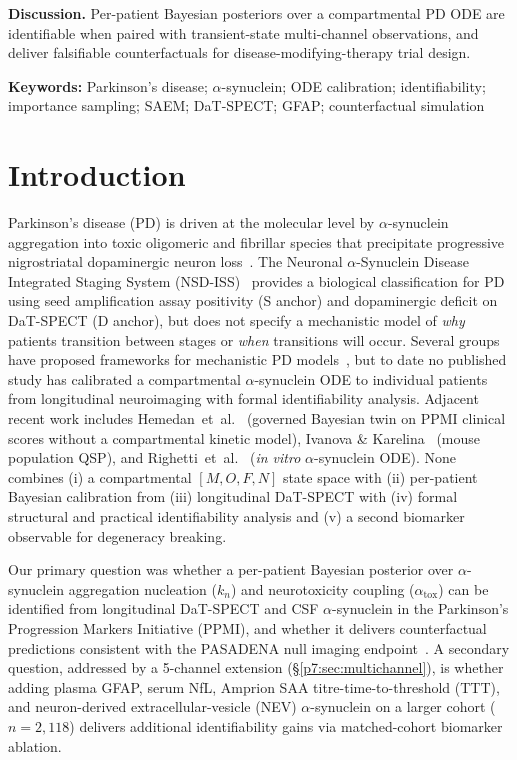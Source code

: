 \noindent\textbf{Discussion.}
Per-patient Bayesian posteriors over a compartmental PD ODE are identifiable when paired with transient-state multi-channel observations, and deliver falsifiable counterfactuals for disease-modifying-therapy trial design.

\vspace{0.4em}\noindent\textbf{Keywords:} Parkinson's disease; $\alpha$-synuclein; ODE calibration; identifiability; importance sampling; SAEM; DaT-SPECT; GFAP; counterfactual simulation

\newpage

\section{Introduction}
\label{p7:sec:intro}

Parkinson's disease (PD) is driven at the molecular level by $\alpha$-synuclein aggregation into toxic oligomeric and fibrillar species that precipitate progressive nigrostriatal dopaminergic neuron loss~\cite{calabresi2023}. The Neuronal $\alpha$-Synuclein Disease Integrated Staging System (NSD-ISS)~\cite{simuni2024} provides a biological classification for PD using seed amplification assay positivity (S anchor) and dopaminergic deficit on DaT-SPECT (D anchor), but does not specify a mechanistic model of \emph{why} patients transition between stages or \emph{when} transitions will occur. Several groups have proposed frameworks for mechanistic PD models~\cite{denaro2024,bakshi2018}, but to date no published study has calibrated a compartmental $\alpha$-synuclein ODE to individual patients from longitudinal neuroimaging with formal identifiability analysis. Adjacent recent work includes Hemedan~et~al.~\cite{hemedan2026} (governed Bayesian twin on PPMI clinical scores without a compartmental kinetic model), Ivanova \& Karelina~\cite{ivanova2024} (mouse population QSP), and Righetti~et~al.~\cite{righetti2025} (\textit{in vitro} $\alpha$-synuclein ODE). None combines (i) a compartmental $[M,O,F,N]$ state space with (ii) per-patient Bayesian calibration from (iii) longitudinal DaT-SPECT with (iv) formal structural and practical identifiability analysis and (v) a second biomarker observable for degeneracy breaking.

Our primary question was whether a per-patient Bayesian posterior over $\alpha$-synuclein aggregation nucleation ($k_n$) and neurotoxicity coupling ($\alpha_\text{tox}$) can be identified from longitudinal DaT-SPECT and CSF $\alpha$-synuclein in the Parkinson's Progression Markers Initiative (PPMI), and whether it delivers counterfactual predictions consistent with the PASADENA null imaging endpoint~\cite{pagano2022}. A secondary question, addressed by a 5-channel extension (\S\ref{p7:sec:multichannel}), is whether adding plasma GFAP, serum NfL, Amprion SAA titre-time-to-threshold (TTT), and neuron-derived extracellular-vesicle (NEV) $\alpha$-synuclein on a larger cohort ($n{=}2{,}118$) delivers additional identifiability gains via matched-cohort biomarker ablation.


